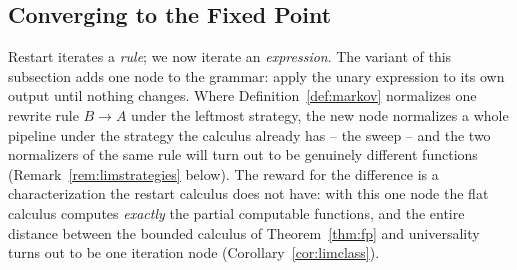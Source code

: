 
\subsection{Converging to the Fixed Point}
\label{ssec:lim}

Restart iterates a \emph{rule}; we now iterate an \emph{expression}. The
variant of this subsection adds one node to the grammar: apply the
unary expression to its own output until nothing changes. Where
Definition~\ref{def:markov} normalizes one rewrite rule
$B \to A$ under the leftmost strategy, the new node normalizes a whole
pipeline under the strategy the calculus already has -- the sweep -- and
the two normalizers of the same rule will turn out to be genuinely
different functions (Remark~\ref{rem:limstrategies} below). The reward for the
difference is a characterization the restart calculus does not have:
with this one node the flat calculus computes \emph{exactly} the partial
computable functions, and the entire distance between the bounded
calculus of Theorem~\ref{thm:fp} and universality turns out to be one
iteration node (Corollary~\ref{cor:limclass}).

